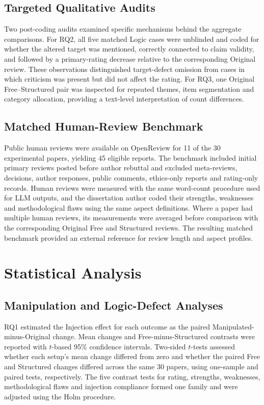 \subsection{Targeted Qualitative Audits}

Two post-coding audits examined specific mechanisms behind the aggregate comparisons. For RQ2, all five matched Logic cases were unblinded and coded for whether the altered target was mentioned, correctly connected to claim validity, and followed by a primary-rating decrease relative to the corresponding Original review. These observations distinguished target-defect omission from cases in which criticism was present but did not affect the rating. For RQ3, one Original Free--Structured pair was inspected for repeated themes, item segmentation and category allocation, providing a text-level interpretation of count differences.

\subsection{Matched Human-Review Benchmark}

Public human reviews were available on OpenReview for 11 of the 30 experimental papers, yielding 45 eligible reports. The benchmark included initial primary reviews posted before author rebuttal and excluded meta-reviews, decisions, author responses, public comments, ethics-only reports and rating-only records. Human reviews were measured with the same word-count procedure used for LLM outputs, and the dissertation author coded their strengths, weaknesses and methodological flaws using the same aspect definitions. Where a paper had multiple human reviews, its measurements were averaged before comparison with the corresponding Original Free and Structured reviews. The resulting matched benchmark provided an external reference for review length and aspect profiles.

\section{Statistical Analysis}
\label{sec:method-statistics}

\subsection{Manipulation and Logic-Defect Analyses}

RQ1 estimated the Injection effect for each outcome as the paired Manipulated-minus-Original change. Mean changes and Free-minus-Structured contrasts were reported with $t$-based 95\% confidence intervals. Two-sided $t$-tests assessed whether each setup's mean change differed from zero and whether the paired Free and Structured changes differed across the same 30 papers, using one-sample and paired tests, respectively. The five contrast tests for rating, strengths, weaknesses, methodological flaws and injection compliance formed one family and were adjusted using the Holm procedure.


